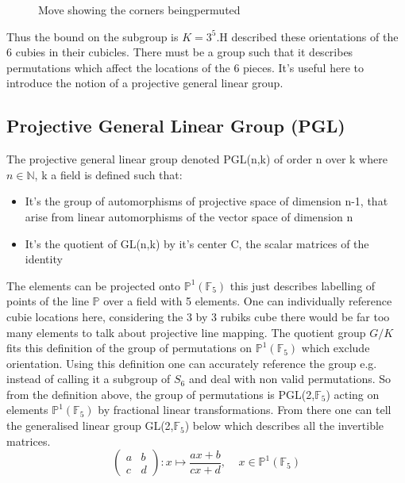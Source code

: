 \documentclass{article}
\newcounter{lem}[section]\setcounter{lem}{0}
\begin{document}
\begin{figure}[h]
\centering
  \TwoCubeSolved%
  \changecornerarrow
  \TwoRotation{\changecorner}
  \caption{Move showing the corners beingpermuted}
\end{figure}
Thus the bound on the subgroup is $K = 3^5$.\newline H described these orientations of the 6 cubies in their cubicles. There must be a group such that it describes permutations which affect the locations of the 6 pieces.
It's useful here to introduce the notion of a projective general linear group. 

\subsection*{Projective General Linear Group (PGL)}
The projective general linear group denoted PGL(n,k) of order n over k where $n \in \mathbb{N}$, k a field is defined such that:
\begin{itemize}
\item It's the group of automorphisms of projective space of dimension n-1, that arise from linear automorphisms of the vector space of dimension n
\item It's the quotient of GL(n,k) by it's center C, the scalar matrices of the identity
\end{itemize} 

The elements can be projected onto $\mathbb{P}^{1}(\mathbb{F}_5)$ this just describes labelling of points of the line $\mathbb{P}$ over a field with 5 elements. One can individually reference cubie locations here, considering the 3 by 3 rubiks cube there would be far too many elements to talk about projective line mapping. The quotient group $G/K$ fits this definition of the group of permutations on $\mathbb{P}^{1}(\mathbb{F}_5)$ which exclude orientation. Using this definition one can accurately reference the group e.g. instead of calling it a subgroup of $S_6$ and deal with non valid permutations. So from the definition above, the group of permutations is PGL(2,$\mathbb{F}_5$) acting on elements $\mathbb{P}^{1}(\mathbb{F}_5)$ by fractional linear  transformations. From there one can tell the generalised linear group GL(2,$\mathbb{F}_5$) below which describes all the invertible matrices.
\begin{equation}
\begin{pmatrix} a & b \\ c & d \end{pmatrix} : x \mapsto \frac{ax + b}{cx + d},\ \ \ \ \ x \in \mathbb{P}^{1}(\mathbb{F}_5)
\end{equation}
\end{document}
